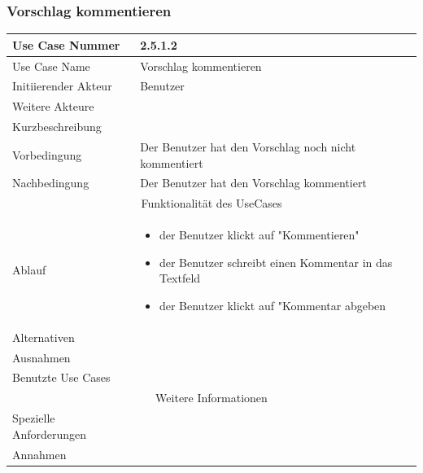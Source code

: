 \documentclass[10pt,a4paper]{article}
\begin{document}
\subsubsection{Vorschlag kommentieren}
		\begin{tabular}{|l|p{.5\linewidth}|}
		\hline Use Case Nummer & 2.5.1.2 \\ 
		\hline Use Case Name & Vorschlag kommentieren \\ 
		\hline Initiierender Akteur & Benutzer \\
		\hline Weitere Akteure &  \\
		\hline Kurzbeschreibung &  \\
		\hline Vorbedingung & Der Benutzer hat den Vorschlag noch nicht kommentiert \\
		\hline Nachbedingung & Der Benutzer hat den Vorschlag kommentiert \\
		\hline \multicolumn{2}{|c|}{Funktionalität des UseCases}\\
		\hline Ablauf & \begin{itemize}
			\item der Benutzer klickt auf "Kommentieren"
			\item der Benutzer schreibt einen Kommentar in das Textfeld
			\item der Benutzer klickt auf "Kommentar abgeben
		\end{itemize} \\
		\hline Alternativen &  \\
		\hline Ausnahmen &  \\
		\hline Benutzte Use Cases &  \\
		\hline \multicolumn{2}{|c|}{Weitere Informationen} \\
		\hline Spezielle Anforderungen &  \\
		\hline Annahmen &  \\
		\hline
		\end{tabular}
\end{document}
